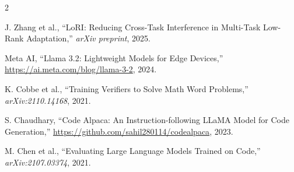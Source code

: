 \documentclass[a4paper,10pt]{article}
\begin{document}
\begin{multicols}{2}
\begin{small}
\noindent
[6] J. Zhang et al., ``LoRI: Reducing Cross-Task Interference in Multi-Task Low-Rank Adaptation,'' \textit{arXiv preprint}, 2025.

\noindent
[7] Meta AI, ``Llama 3.2: Lightweight Models for Edge Devices,'' \url{https://ai.meta.com/blog/llama-3-2}, 2024.

\noindent
[8] K. Cobbe et al., ``Training Verifiers to Solve Math Word Problems,'' \textit{arXiv:2110.14168}, 2021.

\noindent
[9] S. Chaudhary, ``Code Alpaca: An Instruction-following LLaMA Model for Code Generation,'' \url{https://github.com/sahil280114/codealpaca}, 2023.

\noindent
[10] M. Chen et al., ``Evaluating Large Language Models Trained on Code,'' \textit{arXiv:2107.03374}, 2021.
\end{small}

\end{multicols}
\end{document}
